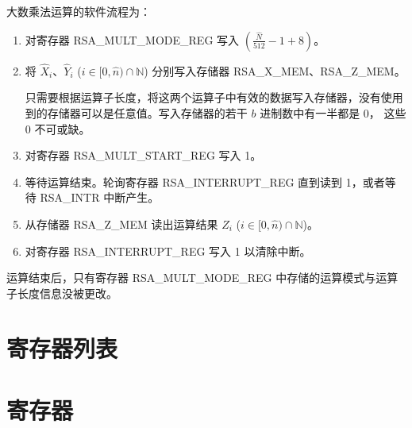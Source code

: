 \documentclass[main\_\_CN.tex]{subfiles}
\begin{document}
大数乘法运算的软件流程为：

\begin{enumerate}

    \item 对寄存器 RSA\_MULT\_MODE\_REG 写入 \begin{math}( \frac{\hat{N}}{512} - 1 + 8 )\end{math}。

    \item 将
        \begin{math}\hat{X}_{i}\end{math}、\begin{math}\hat{Y}_{i}\end{math}
        (\begin{math}i \in [0,\hat{n}) \cap \mathbb{N}\end{math})
        分别写入存储器 RSA\_X\_MEM、RSA\_Z\_MEM。
        
        只需要根据运算子长度，将这两个运算子中有效的数据写入存储器，没有使用到的存储器可以是任意值。写入存储器的若干 \begin{math}b\end{math} 进制数中有一半都是 0，
        这些 0 不可或缺。
        
    \item 对寄存器 RSA\_MULT\_START\_REG 写入 1。

    \item 等待运算结束。轮询寄存器 RSA\_INTERRUPT\_REG 直到读到 1，或者等待 RSA\_INTR 中断产生。
    
    \item 从存储器 RSA\_Z\_MEM 读出运算结果 \begin{math}Z_{i}\end{math}
        (\begin{math}i \in [0,\hat{n}) \cap \mathbb{N}\end{math})。

    \item 对寄存器 RSA\_INTERRUPT\_REG 写入 1 以清除中断。

\end{enumerate}

运算结束后，只有寄存器 RSA\_MULT\_MODE\_REG 中存储的运算模式与运算子长度信息没被更改。

\hypertarget{rsa-reg-summ}{}
\section{寄存器列表}

{\clearpage}
\section{寄存器}

\end{document}
